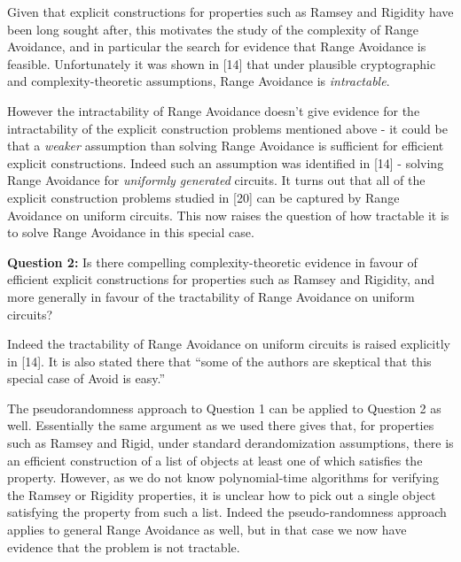 \documentclass[10pt,a4paper]{article}
\begin{document}
Given that explicit constructions for properties such as Ramsey and Rigidity have been long sought after, this motivates the study of the complexity of Range Avoidance, and in particular the search for evidence that Range Avoidance is feasible. Unfortunately it was shown in [14] that under plausible cryptographic and complexity-theoretic assumptions, Range Avoidance is \emph{intractable}.\par




However the intractability of Range Avoidance doesn’t give evidence for the intractability of the explicit construction problems mentioned above - it could be that a \emph{weaker} assumption than solving Range Avoidance is sufficient for efficient explicit constructions. Indeed such an assumption was identified in [14] - solving Range Avoidance for \emph{uniformly generated} circuits. It turns out that all of the explicit construction problems studied in [20] can be captured by Range Avoidance on uniform circuits. This now raises the question of how tractable it is to solve Range Avoidance in this special case. 

\textbf{Question 2:} Is there compelling complexity-theoretic evidence in favour of efficient explicit constructions for properties such as Ramsey and Rigidity, and more generally in favour of the tractability of Range Avoidance on uniform circuits? 

Indeed the tractability of Range Avoidance on uniform circuits is raised explicitly in [14]. It is also stated there that “some of the authors are skeptical that this special case of Avoid is easy.”\par




The pseudorandomness approach to Question 1 can be applied to Question 2 as well. Essentially the same argument as we used there gives that, for properties such as Ramsey and Rigid, under standard derandomization assumptions, there is an efficient construction of a list of objects at least one of which satisfies the property. However, as we do not know polynomial-time algorithms for verifying the Ramsey or Rigidity properties, it is unclear how to pick out a single object satisfying the property from such a list. Indeed the pseudo-randomness approach applies to general Range Avoidance as well, but in that case we now have evidence that the problem is not tractable.\par
\end{document}
